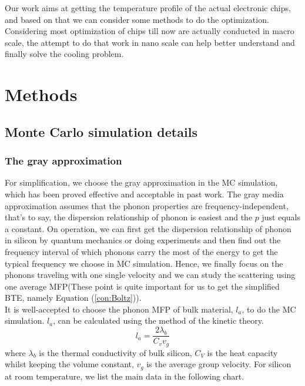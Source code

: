 \indent Our work aims at getting the temperature profile of the actual electronic chips, and based on that we can consider some methods to do the optimization. Considering most optimization of chips till now are actually conducted in macro scale, the attempt to do that work in nano scale can help better understand and finally solve the cooling problem.


\section{Methods}
\subsection{Monte Carlo simulation details}
\subsubsection{The gray approximation}
For simplification, we choose the gray approximation in the MC simulation, which has been proved effective and acceptable in past work\cite{hua0,hua1}. The gray media approximation assumes that the phonon properties are frequency-independent, that's to say, the dispersion relationship of phonon is easiest and the $p$ just equals a constant. On operation, we can first get the dispersion relationship of phonon in silicon by quantum mechanics or doing experiments and then find out the frequency interval of which phonons carry the most of the energy to get the typical frequency we choose in MC simulation. Hence, we finally focus on the phonons traveling with one single velocity and we can study the scattering using one average MFP(These point is quite important for us to get the simplified BTE, namely Equation (\ref{con:Boltz})).\\
\indent It is well-accepted to choose the phonon MFP of bulk material, $l_a$, to do the MC simulation. $l_a$, can be calculated using the method of the kinetic theory.
\begin{equation} \label{eq2}
l_a=\frac{2 \lambda_{b}}{C_v v_g}
\end{equation}
where $\lambda_{b}$ is the thermal conductivity of bulk silicon, $C_V$ is the heat capacity whilst keeping the volume constant, $v_g$ is the average group velocity.
For silicon at room temperature, we list the main data in the following chart\cite{Super}.\\


